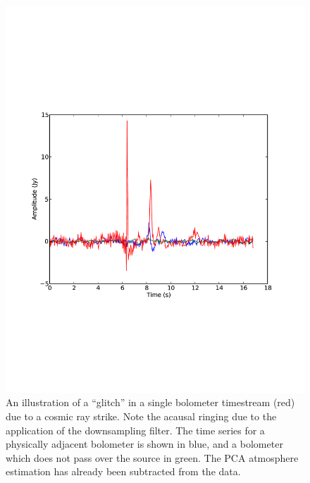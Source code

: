 \begin{figure}
  \begin{minipage}{6.5in}
    \begin{center}
      \includegraphics[scale=0.5]{flagger_plots}
      \caption{An illustration of a ``glitch'' in a single bolometer timestream
      (red) due to a cosmic ray strike.  Note the acausal ringing due to the
      application of the downsampling filter.  The time series for a physically
      adjacent bolometer is shown in blue, and a bolometer which does not pass
      over the source in green.  The PCA atmosphere estimation has already been
      subtracted from the data.}
    \end{center}
  \end{minipage}

\end{figure}


\renewcommand{\thefigure}{\arabic{figure}}

